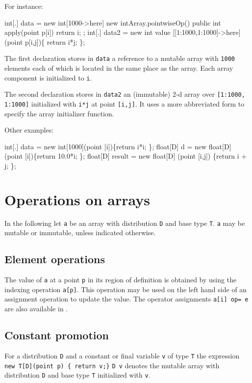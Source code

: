 For instance:
\begin{x10}
int[.] data = new int[1000->here] new intArray.pointwiseOp() {
                public int apply(point p[i]) {
                  return i;
                }
              };
int[.] data2 = new int value [[1:1000,1:1000]->here] 
                  (point p[i,j])\{ return i*j; \};
\end{x10}

{}\noindent 
The first declaration stores in {\tt data} a reference to a mutable
array with {\tt 1000} elements each of which is located in the
same place as the array. Each array component is initialized to {\tt i}.

The second declaration stores in {\tt data2} an (immutable)
2-d array over {\tt [1:1000, 1:1000]} initialized with {\tt i*j}
at point {\tt [i,j]}. It uses a more abbreviated form to specify 
the array initializer function.

Other examples:
\begin{x10}
int[.] data = new int[1000](point [i])\{return i*i; \};
float[D] d = new float[D] (point [i])\{return 10.0*i; \}; 
float[D] result = new float[D] (point [i,j]) \{return i + j; \};
\end{x10}

\section{Operations on arrays}
In the following let {\tt a} be an array with distribution {\tt D} and
base type {\tt T}. {\tt a} may be mutable or immutable, unless
indicated otherwise.

\subsection{Element operations}
The value of {\tt a} at a point {\tt p} in its region of definition is
obtained by using the indexing operation {\tt a[p]}. This operation
may be used on the left hand side of an assignment operation to update
the value. The operator assignments {\tt a[i] op= e} are also available
in \Xten{}.

\subsection{Constant promotion}\label{ConstantArray}

For a distribution {\tt D} and a constant or final variable {\tt v} of
type {\tt T} the expression {\tt new T[D](point p) \{ return v;\}}
{\tt D v} denotes the mutable array with
distribution {\tt D} and base type {\tt T} initialized with {\tt v}.

